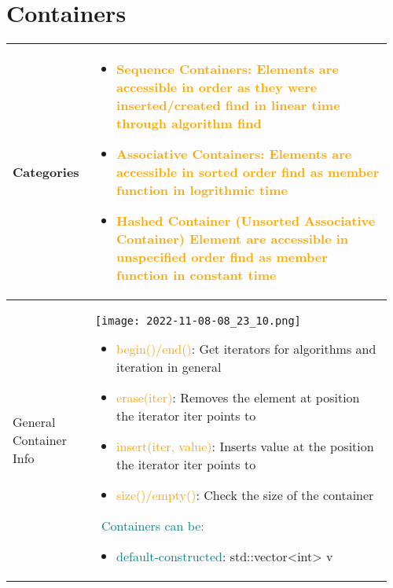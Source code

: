 \documentclass[main.tex,fontsize=8pt,paper=a4,paper=portrait,DIV=calc]{scrartcl}
\begin{document}
\begin{table}[ht!]
\section{Containers}
\begin{tabular}{|m{0.2\linewidth}|m{0.755\linewidth}|}
\hline
Categories &
\vspace{2mm}
\begin{itemize}
\item \textcolor{orange}{Sequence Containers: \newline
  Elements are accessible in order as they were inserted/created\newline
  find in linear time through algorithm find}
\item \textcolor{orange}{Associative Containers:\newline
  Elements are accessible in sorted order\newline
  find as member function in logrithmic time}
\item \textcolor{orange}{Hashed Container (Unsorted Associative Container)\newline
  Element are accessible in unspecified order\newline
  find as member function in constant time}
\vspace{-2mm}
\end{itemize}\\ 
\hline
General Container Info &
\vspace{2mm}
\texttt{[image: 2022-11-08-08\_23\_10.png]}\newline
\begin{itemize}
\item \textcolor{orange}{begin()/end()}: Get iterators for algorithms and iteration in general
\item \textcolor{orange}{erase(iter)}: Removes the element at position the iterator iter points to
\item \textcolor{orange}{insert(iter, value)}: Inserts value at the position the iterator iter points to
\item \textcolor{orange}{size()/empty()}: Check the size of the container
\vspace{-2mm}
\end{itemize}
\, \newline
\textcolor{teal}{Containers can be:}\newline
\begin{itemize}
  \item \textcolor{teal}{default-constructed}: std::vector<int> v{}

\end{itemize}
\end{tabular}
\end{table}
\end{document}
